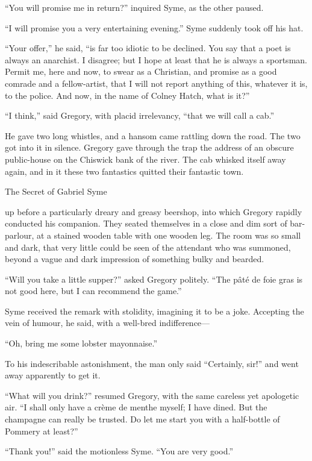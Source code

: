 “You will promise me in return?” inquired Syme, as the other paused.

“I will promise you a very entertaining evening.” Syme suddenly took off his hat.

“Your offer,” he said, “is far too idiotic to be declined. You say that a poet is always an anarchist. I disagree; but I hope at least that he is always a sportsman. Permit me, here and now, to swear as a Christian, and promise as a good comrade and a fellow-artist, that I will not report anything of this, whatever it is, to the police. And now, in the name of Colney Hatch, what is it?”

“I think,” said Gregory, with placid irrelevancy, “that we will call a cab.”

He gave two long whistles, and a hansom came rattling down the road. The two got into it in silence. Gregory gave through the trap the address of an obscure public-house on the Chiswick bank of the river. The cab whisked itself away again, and in it these two fantastics quitted their fantastic town.

\chap[secretof] The Secret of Gabriel Syme

 up before a particularly dreary and greasy beershop, into which Gregory rapidly conducted his companion. They seated themselves in a close and dim sort of bar-parlour, at a stained wooden table with one wooden leg. The room was so small and dark, that very little could be seen of the attendant who was summoned, beyond a vague and dark impression of something bulky and bearded.

“Will you take a little supper?” asked Gregory politely. “The pâté de foie gras is not good here, but I can recommend the game.”

Syme received the remark with stolidity, imagining it to be a joke. Accepting the vein of humour, he said, with a well-bred indifference⁠—

“Oh, bring me some lobster mayonnaise.”

To his indescribable astonishment, the man only said “Certainly, sir!” and went away apparently to get it.

“What will you drink?” resumed Gregory, with the same careless yet apologetic air. “I shall only have a crème de menthe myself; I have dined. But the champagne can really be trusted. Do let me start you with a half-bottle of Pommery at least?”

“Thank you!” said the motionless Syme. “You are very good.”

